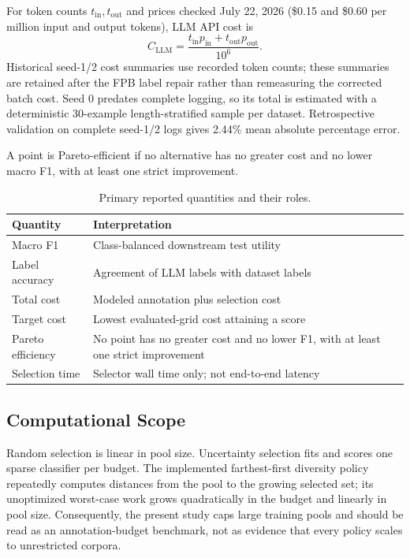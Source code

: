 \documentclass[conference]{IEEEtran}
\begin{document}
For token counts $t_{\mathrm{in}},t_{\mathrm{out}}$ and prices checked July 22, 2026 (\$0.15 and \$0.60 per million input and output tokens), LLM API cost is
\begin{equation}
C_{\mathrm{LLM}} =
\frac{t_{\mathrm{in}}p_{\mathrm{in}}+t_{\mathrm{out}}p_{\mathrm{out}}}{10^6}.
\end{equation}
Historical seed-1/2 cost summaries use recorded token counts; these summaries are retained after the FPB label repair rather than remeasuring the corrected batch cost. Seed 0 predates complete logging, so its total is estimated with a deterministic 30-example length-stratified sample per dataset. Retrospective validation on complete seed-1/2 logs gives 2.44\% mean absolute percentage error.

A point is Pareto-efficient if no alternative has no greater cost and no lower macro F1, with at least one strict improvement.

\begin{table}[t]
\caption{Primary reported quantities and their roles.}
\label{tab:metrics}
\centering
\footnotesize
\begin{tabular}{lp{}}
\toprule
Quantity & Interpretation \\
\midrule
Macro F1 & Class-balanced downstream test utility \\
Label accuracy & Agreement of LLM labels with dataset labels \\
Total cost & Modeled annotation plus selection cost \\
Target cost & Lowest evaluated-grid cost attaining a score \\
Pareto efficiency & No point has no greater cost and no lower F1, with at least one strict improvement \\
Selection time & Selector wall time only; not end-to-end latency \\
\bottomrule
\end{tabular}
\end{table}

\subsection{Computational Scope}
Random selection is linear in pool size. Uncertainty selection fits and scores one sparse classifier per budget. The implemented farthest-first diversity policy repeatedly computes distances from the pool to the growing selected set; its unoptimized worst-case work grows quadratically in the budget and linearly in pool size. Consequently, the present study caps large training pools and should be read as an annotation-budget benchmark, not as evidence that every policy scales to unrestricted corpora.
\end{document}
